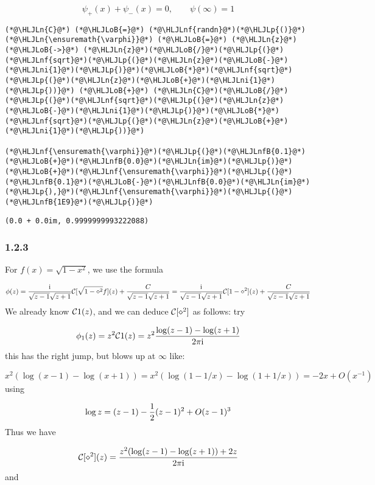 \documentclass[12pt,landscape]{article}
\newcommand{\HLJLn}[1]{#1}
\newcommand{\HLJLnf}[1]{\textcolor[RGB]{66,102,213}{#1}}
\newcommand{\HLJLnfB}[1]{\textcolor[RGB]{59,151,46}{#1}}
\newcommand{\HLJLni}[1]{\textcolor[RGB]{59,151,46}{#1}}
\newcommand{\HLJLoB}[1]{\textcolor[RGB]{102,102,102}{\textbf{#1}}}
\newcommand{\HLJLp}[1]{#1}
\def\I{ {\rm i} }
\def\CC{ {\cal C} }
\begin{document}
{\[
\psi_+(x) + \psi_-(x) = 0, \qquad \psi(\infty) = 1
\]

\begin{lstlisting}
(*@\HLJLn{C}@*) (*@\HLJLoB{=}@*) (*@\HLJLnf{randn}@*)(*@\HLJLp{()}@*)
(*@\HLJLn{\ensuremath{\varphi}}@*) (*@\HLJLoB{=}@*) (*@\HLJLn{z}@*) (*@\HLJLoB{->}@*) (*@\HLJLn{z}@*)(*@\HLJLoB{/}@*)(*@\HLJLp{(}@*)(*@\HLJLnf{sqrt}@*)(*@\HLJLp{(}@*)(*@\HLJLn{z}@*)(*@\HLJLoB{-}@*)(*@\HLJLni{1}@*)(*@\HLJLp{)}@*)(*@\HLJLoB{*}@*)(*@\HLJLnf{sqrt}@*)(*@\HLJLp{(}@*)(*@\HLJLn{z}@*)(*@\HLJLoB{+}@*)(*@\HLJLni{1}@*)(*@\HLJLp{))}@*) (*@\HLJLoB{+}@*) (*@\HLJLn{C}@*)(*@\HLJLoB{/}@*)(*@\HLJLp{(}@*)(*@\HLJLnf{sqrt}@*)(*@\HLJLp{(}@*)(*@\HLJLn{z}@*)(*@\HLJLoB{-}@*)(*@\HLJLni{1}@*)(*@\HLJLp{)}@*)(*@\HLJLoB{*}@*)(*@\HLJLnf{sqrt}@*)(*@\HLJLp{(}@*)(*@\HLJLn{z}@*)(*@\HLJLoB{+}@*)(*@\HLJLni{1}@*)(*@\HLJLp{))}@*)

(*@\HLJLnf{\ensuremath{\varphi}}@*)(*@\HLJLp{(}@*)(*@\HLJLnfB{0.1}@*)(*@\HLJLoB{+}@*)(*@\HLJLnfB{0.0}@*)(*@\HLJLn{im}@*)(*@\HLJLp{)}@*)(*@\HLJLoB{+}@*)(*@\HLJLnf{\ensuremath{\varphi}}@*)(*@\HLJLp{(}@*)(*@\HLJLnfB{0.1}@*)(*@\HLJLoB{-}@*)(*@\HLJLnfB{0.0}@*)(*@\HLJLn{im}@*)(*@\HLJLp{),}@*)(*@\HLJLnf{\ensuremath{\varphi}}@*)(*@\HLJLp{(}@*)(*@\HLJLnfB{1E9}@*)(*@\HLJLp{)}@*)
\end{lstlisting}

\begin{lstlisting}
(0.0 + 0.0im, 0.9999999993222088)
\end{lstlisting}


\subsubsection{1.2.3}
For $f(x) = \sqrt{1-x^2}$, we use the formula

\[
\phi(z) = {\I \over \sqrt{z - 1} \sqrt{z+1}} \CC[\sqrt{1-\diamond^2} f](z) + {C \over \sqrt{z-1}\sqrt{z+1}}  = {\I \over \sqrt{z - 1} \sqrt{z+1}} \CC[1-\diamond^2](z) + {C \over \sqrt{z-1}\sqrt{z+1}}
\]
We already know $\CC1(z)$, and we can deduce $\CC[\diamond^2]$ as follows: try

\[
\phi_1(z) = z^2 \CC1(z) = z^2 {\log(z-1) - \log(z+1) \over 2 \pi \I}
\]
this has the right jump, but blows up at $\infty$ like:

\[
x^2 (\log(x-1) - \log(x+1)) = x^2 (\log(1-1/x)  - \log(1+1/x) )
= -2 x + O(x^{-1})
\]
using

\[
\log z = (z-1) - {1\over 2}(z-1)^2 + O(z-1)^3
\]
Thus we have

\[
\CC[\diamond^2](z) = {z^2 (\log(z-1) - \log(z+1)) + 2 z \over 2 \pi \I}
\]
and

}
\end{document}
